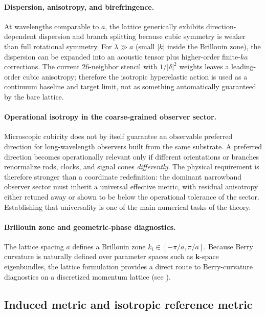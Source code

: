 \paragraph{Dispersion, anisotropy, and birefringence.}
At wavelengths comparable to $a$, the lattice generically exhibits direction-dependent dispersion and branch
splitting because cubic symmetry is weaker than full rotational symmetry.
For $\lambda\gg a$ (small $|k|$ inside the Brillouin zone), the dispersion can be expanded into an acoustic tensor plus
higher-order finite-$ka$ corrections. The current $26$-neighbor stencil with $1/|\delta|^2$ weights leaves a
leading-order cubic anisotropy; therefore the isotropic hyperelastic action is used as a continuum baseline and target
limit, not as something automatically guaranteed by the bare lattice.

\paragraph{Operational isotropy in the coarse-grained observer sector.}
Microscopic cubicity does not by itself guarantee an observable preferred direction for long-wavelength observers built
from the same substrate.
A preferred direction becomes operationally relevant only if different orientations or branches renormalize rods,
clocks, and signal cones \emph{differently}.
The physical requirement is therefore stronger than a coordinate redefinition: the dominant narrowband observer sector
must inherit a universal effective metric, with residual anisotropy either retuned away or shown to be below the
operational tolerance of the sector.
Establishing that universality is one of the main numerical tasks of the theory.

\paragraph{Brillouin zone and geometric-phase diagnostics.}
The lattice spacing $a$ defines a Brillouin zone $k_i\in[-\pi/a,\pi/a]$.
Because Berry curvature is naturally defined over parameter spaces such as $\mathbf{k}$-space eigenbundles,
the lattice formulation provides a direct route to Berry-curvature diagnostics on a discretized momentum lattice
(see ).

\subsection{Induced metric and isotropic reference metric}

